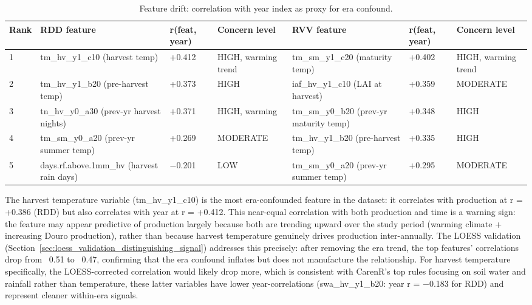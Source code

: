 \begin{table}[htbp]
  \centering
  \caption{Feature drift: correlation with year index as proxy for era confound.}\label{tab:appb_6}
  \footnotesize
  \begin{adjustbox}{max width=\textwidth}
    \begin{tabularx}{\textwidth}{l|p{2.6cm}|p{1.5cm}|p{2.3cm}|p{2.6cm}|p{1.5cm}|X}
  \toprule
  Rank & RDD feature & r(feat, year) & Concern level & RVV feature & r(feat, year) & Concern level \\
  \midrule
  1 & tm\_hv\_y1\_c10
(harvest temp) & +0.412 & HIGH, warming trend & tm\_sm\_y1\_c20
(maturity temp) & +0.402 & HIGH, warming trend \\
  2 & tm\_hv\_y1\_b20
(pre-harvest temp) & +0.373 & HIGH & iaf\_hv\_y1\_c10
(LAI at harvest) & +0.359 & MODERATE \\
  3 & tn\_hv\_y0\_a30
(prev-yr harvest nights) & +0.371 & HIGH, warming & tm\_sm\_y0\_b20
(prev-yr maturity temp) & +0.348 & HIGH \\
  4 & tm\_sm\_y0\_a20
(prev-yr summer temp) & +0.269 & MODERATE & tm\_hv\_y1\_b20
(pre-harvest temp) & +0.335 & HIGH \\
  5 & days.rf.above.1mm\_hv
(harvest rain days) & $-$0.201 & LOW & tm\_sm\_y0\_a20
(prev-yr summer temp) & +0.295 & MODERATE \\
  \bottomrule
  \end{tabularx}
  \end{adjustbox}

\end{table}


The harvest temperature variable (tm\_hv\_y1\_c10) is the most era-confounded feature in the dataset: it correlates with production at r = +0.386 (RDD) but also correlates with year at r = +0.412. This near-equal correlation with both production and time is a warning sign: the feature may appear predictive of production largely because both are trending upward over the study period (warming climate + increasing Douro production), rather than because harvest temperature genuinely drives production inter-annually. The LOESS validation (Section~\ref{sec:loess_validation_distinguishing_signal}) addresses this precisely: after removing the era trend, the top features'  correlations drop from ~0.51 to ~0.47, confirming that the era confound inflates but does not manufacture the relationship. For harvest temperature specifically, the LOESS-corrected correlation would likely drop more, which is consistent with CarenR's top rules focusing on soil water and rainfall rather than temperature, these latter variables have lower year-correlations (swa\_hv\_y1\_b20: year r = $-$0.183 for RDD) and represent cleaner within-era signals.

